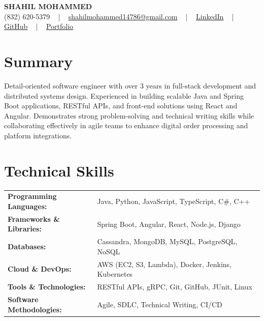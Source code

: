\documentclass[letterpaper,11pt]{article}
\begin{document}
\begin{center}
    {\fontsize{14pt}{12pt}\selectfont \textbf{\MakeUppercase{Shahil Mohammed}}}\\ \vspace{2pt}
    \fontsize{10pt}{12pt}\selectfont (832) 620-5379 ~ | ~ \href{mailto:shahilmohammed14786@gmail.com}{shahilmohammed14786@gmail.com} ~ | ~  
    \href{https://www.linkedin.com/in/shahil-mohammed-9652931a1/}{\color{blue}\underline{LinkedIn}}  ~ | ~ 
    \href{https://github.com/freakbeast14}{\color{blue}\underline{GitHub}} ~ | ~ 
    \href{https://shahil-mohammed.netlify.app/}{\color{blue}\underline{Portfolio}}
    \vspace{-8pt}
\end{center}

\section{Summary}
\fontsize{9pt}{10pt}\selectfont
Detail-oriented software engineer with over 3 years in full-stack development and distributed systems design. Experienced in building scalable Java and Spring Boot applications, RESTful APIs, and front-end solutions using React and Angular. Demonstrates strong problem-solving and technical writing skills while collaborating effectively in agile teams to enhance digital order processing and platform integrations.
 \vspace{-5pt}
 
\section{Technical Skills}
        \vspace{-14pt}
        \begin{table}[h]
            \fontsize{9pt}{10pt}\selectfont
            \begin{tabular}{p{0.35\linewidth} p{0.65\linewidth}}
                \textbf{Programming Languages:} & Java, Python, JavaScript, TypeScript, C\#, C++ \\
                \textbf{Frameworks \& Libraries:} & Spring Boot, Angular, React, Node.js, Django \\
                \textbf{Databases:} & Cassandra, MongoDB, MySQL, PostgreSQL, NoSQL \\
                \textbf{Cloud \& DevOps:} & AWS (EC2, S3, Lambda), Docker, Jenkins, Kubernetes \\
                \textbf{Tools \& Technologies:} & RESTful APIs, gRPC, Git, GitHub, JUnit, Linux \\
                \textbf{Software Methodologies:} & Agile, SDLC, Technical Writing, CI/CD \\
            \end{tabular}
        \end{table}
 \vspace{-15pt}
 
\end{document}
